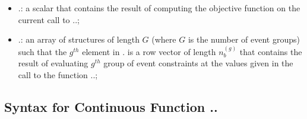 \documentclass[10pt]{article}
\newcommand{\bfblue}[1]{\textrm{{\color{blue}{\bf #1}}}}
\newcommand{\slred}[1]{\textrm{\color{red}{\sl #1}}}
\begin{document}
\begin{itemize}
  \item \slred{output}.\bfblue{objective}: a scalar that contains the
   result of computing the objective function on the current call to 
   \slred{input}.\bfblue{functions}.\bfblue{endpoint};
 \item \slred{output}.\bfblue{eventgroup}:  an array of structures of
   length $G$ (where $G$ is the number of event groups) such that the
$g^{th}$ element in \slred{output}.\bfblue{eventgroup} is a row vector
of length $n_b^{(g)}$ that contains the result of evaluating $g^{th}$
group of event constraints at the values given in the call to the
function \slred{input}.\bfblue{functions}.\bfblue{endpoint};
\end{itemize}

\subsection{Syntax for Continuous Function \slred{setup}.\bfblue{functions}.\bfblue{continuous} \label{sect:continuousSyntax}}
\end{document}
